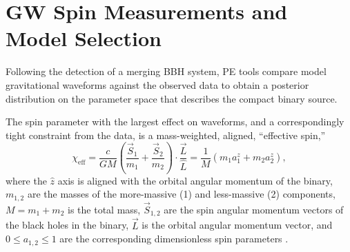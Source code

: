 \documentclass[modern,linenumbers]{aastex61}
\newcommand{\chieff}{\chi_\mathrm{eff}}
\newcommand{\checkme}[1]{\textcolor{red}{#1}}
\newcommand{\OOneSigmaIsoAligned}{\checkme{1.7}}
\newcommand{\OOneOddsIsoAligned}{\checkme{0.087}}
\newcommand{\OTwoSigmaIsoAlignedMin}{\checkme{2.9}}
\newcommand{\OTwoOddsIsoAlignedMin}{\checkme{0.0035}}
\begin{document}
\begin{abstract}
  The first direct detections of \acp{GW} from merging \acp{BBH} open
  a unique window into the formation environment of massive stars and
  their compact remnants.  One promising signature of the formation
  environment is the angular distribution of the \ac{BH} spins;
  systems formed through dynamical interactions among already-compact
  objects are expected to have isotropic spin orientations whereas
  binaries formed from pairs of stars born together are more likely to
  have spins aligned with the binary orbit as a consequence of their
  joint evolution toward a \ac{BBH} system.  By considering existing
  \ac{GW} measurements of $\chieff$, the best-measured combination of
  spin parameters, in the three likely binary black hole detections
  GW150914, LVT151012, and GW151226, we show that the data already
  exhibit a $\OOneSigmaIsoAligned\sigma$ ($\OOneOddsIsoAligned$ odds
  ratio) preference for an isotropic angular distribution amongst a
  suite of models for the spin distribution.  By considering the
  effect of an additional 10 detections drawn from the various models
  in the suite we show that if all observations come from a single
  population such an augmented data set would enable at least a
  $\OTwoSigmaIsoAlignedMin\sigma$ ($\OTwoOddsIsoAlignedMin$ odds
  ratio) distinction between the isotropic and aligned models, and in
  most cases better than $5\sigma$ ($2.9 \times 10^{-7}$ odds ratio).
  The existing preference for a dynamical formation scenario for the
  observed systems will be confirmed (or overturned) confidently in
  the near future by subsequent observations.
\end{abstract}

\acresetall{}

\section{\ac{GW} Spin Measurements and Model Selection}
\label{sec:O1}

Following the detection of a merging \ac{BBH} system, \ac{PE} tools
\citep{2015PhRvD..91d2003V} compare model gravitational waveforms
\citep{2014PhRvD..89h4006P,2014PhRvD..89f1502T,2014PhRvL.113o1101H}
against the observed data to obtain a posterior distribution on the
parameter space that describes the compact binary source.  

The spin parameter with the largest effect on waveforms, and a
correspondingly tight constraint from the data, is a mass-weighted,
aligned, ``effective spin,''
\begin{equation}
  \chieff = \frac{c}{GM} \left( \frac{\vec{S}_1}{m_1} + \frac{\vec{S}_2}{m_2}
  \right) \cdot \frac{\vec{L}}{\hat{L}} = \frac{1}{M} \left( m_1 a_1^z + m_2 a_2^z \right),
\end{equation}
where the $\hat{z}$ axis is aligned with the orbital angular momentum
of the binary, $m_{1,2}$ are the masses of the more-massive (1) and
less-massive (2) components, $M = m_1 + m_2$ is the total mass,
$\vec{S}_{1,2}$ are the spin angular momentum vectors of the black
holes in the binary, $\vec{L}$ is the orbital angular momentum vector,
and $0 \leq a_{1,2} \leq 1$ are the corresponding dimensionless spin
parameters \citep{2016PhRvL.116x1102A}.
\end{document}
